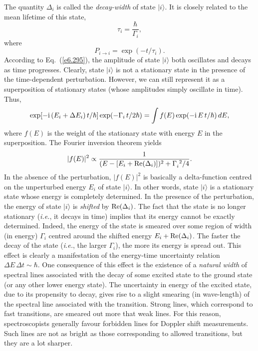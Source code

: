 The quantity $\Delta_i$ is called the {\em decay-width} of state $|i\rangle$.
 It is
closely related to the mean lifetime of this state,
\begin{equation}
\tau_i =\frac{\hbar}{\Gamma_i},
\end{equation}
where 
\begin{equation}
P_{i\rightarrow i} = \exp(- t/\tau_i).
\end{equation}
According to Eq.~(\ref{e6.295}), the amplitude of state $|i\rangle$ both oscillates
and decays as time progresses. Clearly, state $|i\rangle$ is not a
stationary state in the presence of the time-dependent perturbation. 
However, we can still represent it as a superposition of stationary
states (whose amplitudes simply oscillate in time). Thus,
\begin{equation}
\exp[-{\rm i}\,(E_i + \Delta E_i)\,t/\hbar]
\exp( - \Gamma_i\,t/2\hbar)  = \int f(E) \exp(-{\rm i}\, E\,t/\hbar)\,dE,
\end{equation}
where $f(E)$ is the weight of the  stationary state with energy $E$ in the
superposition. The Fourier inversion theorem yields
\begin{equation}
|f(E)|^2 \propto \frac{1}{(E - [E_i +{\rm Re}(\Delta_i)])^2 + \Gamma_i^{~2}/4}.
\end{equation}
In the absence of the perturbation, $|f(E)|^2$ is basically a delta-function
centred on the unperturbed energy $E_i$ of state $|i\rangle$. 
In other words, state $|i\rangle$ is a stationary state whose energy is
completely determined. In the presence of the perturbation, the energy
of state $|i\rangle$ is {\em shifted} by ${\rm Re}(\Delta_i)$. The fact that
the state is no longer stationary ({\em i.e.}, it decays in time) implies that
its energy cannot be exactly determined. Indeed, the 
energy of the state
is smeared over some region of width (in energy) $\Gamma_i$ centred
around the shifted energy $E_i +{\rm Re}(\Delta_i)$. The faster the
decay of the state ({\em i.e.}, the larger $\Gamma_i$), the more its
energy is spread out. This effect is clearly a manifestation of
the energy-time uncertainty relation $\Delta E\, \Delta t \sim \hbar$. 
One consequence of this effect is the existence of a {\em natural
width} of spectral lines associated with the decay of some excited
state to the ground state (or any other lower energy state). The uncertainty
in energy of the excited state, due to its propensity to decay, gives
rise to a slight smearing (in wave-length)
of the spectral line associated with the
transition. Strong lines, which correspond to fast transitions, are smeared out
more that weak lines. For this reason, spectroscopists generally favour
forbidden lines for Doppler shift measurements. Such lines are not as bright
as those corresponding to allowed transitions, but they are a lot sharper. 
